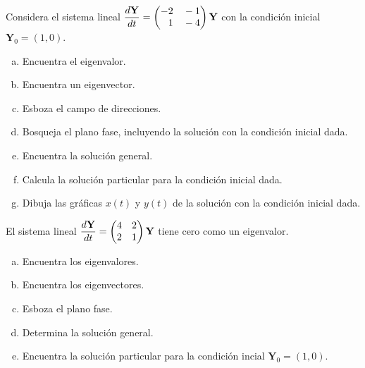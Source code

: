 \documentclass[12pt]{exam}
\newcommand*\colvec[3][]{
    \begin{pmatrix}\ifx\relax#1\relax\else#1\\\fi#2\\#3\end{pmatrix}
}
\begin{document}
\begin{questions}
     \question%
     Considera el sistema lineal $\dfrac{d\mathbf{Y}}{dt}=\colvec{-2\quad-1}{\phantom{-}1\quad-4}\mathbf{Y}$ con la condición inicial $\mathbf{Y}_0=(1,0)$.
     \begin{enumerate}[a)]
         \item Encuentra el eigenvalor.
         \item Encuentra un eigenvector.
         \item Esboza el campo de direcciones.
         \item Bosqueja el plano fase, incluyendo la solución con la condición inicial dada.
         \item Encuentra la solución general.
         \item Calcula la solución particular para la condición inicial dada.
         \item Dibuja las gráficas $x(t)$ y $y(t)$ de la solución con la condición inicial dada.
     \end{enumerate}


     
     
     \question%
     El sistema lineal $\dfrac{d\mathbf{Y}}{dt}=\colvec{4\quad2}{2\quad1}\mathbf{Y}$ tiene cero como un eigenvalor.
     \begin{enumerate}[a)]
         \item Encuentra los eigenvalores.
         \item Encuentra los eigenvectores.
         \item Esboza el plano fase.
         \item Determina la solución general.
         \item Encuentra la solución particular para la condición incial $\mathbf{Y}_0=(1,0)$.
     \end{enumerate}


     


     
     
     
    
     

     
     
        \end{questions}
	
  

    
    
\end{document}
